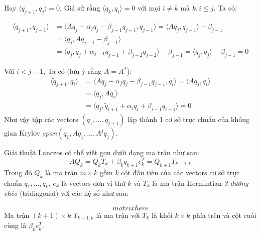 Hay $\langle q_{j+1}, q_j \rangle = 0$. Giả sử rằng $\langle q_k, q_i \rangle = 0$ với mọi 
$i \neq k$ mà $k,i \leq j$. Ta có:

\begin{equation*}
    \begin{split}
        \langle \tilde{q}_{j+1}, q_{j-1} \rangle &= \langle Aq_j - \alpha_jq_j - \beta_{j-1}q_{j-1}, q_{j-1} \rangle 
        = \langle Aq_j, q_{j-1} \rangle - \beta_{j-1} \\
        &= \langle q_j, Aq_{j-1} - \beta_{j-1} \rangle \\
        &= \langle q_j, \tilde{q}_j + \alpha_{j-1}q_{j-1} + \beta_{j-2}q_{j-2} \rangle - \beta_{j-1}
        = \langle q_j, \tilde{q}_j \rangle - \beta_{j - 1} = 0
    \end{split}
\end{equation*}

Với $i < j - 1$, Ta có (lưu ý rằng $A = A^T$):
\begin{equation*}
    \begin{split}
        \langle \tilde{q}_{j+1}, q_{i} \rangle &= \langle Aq_j - \alpha_jq_j - \beta_{j-1}q_{j-1}, q_{i} \rangle 
        = \langle Aq_j, q_i \rangle \\
        &= \langle q_j, Aq_i \rangle \\
        &= \langle q_j, \tilde{q}_{i+1} + \alpha_iq_i + \beta_{i - 1}q_{i - 1} \rangle = 0
    \end{split}
\end{equation*}
Như vậy tập các vectors $(q_1, ..., q_{j+1})$ lập thành 1 cơ sở trực chuẩn của không gian Krylov 
$span(q_1, Aq_1, ..., A^jq_1)$.

Giải thuật Lanczos có thể viết gọn dưới dạng ma trận như sau:
\begin{equation}
    AQ_k = Q_kT_k + \beta_kq_{k+1}e_k^T = Q_{k+1}T_{k+1, k}
\end{equation}
Trong đó $Q_k$ là ma trận $m \times k$ gồm $k$ cột đầu tiên của các vectors cơ sở trực chuẩn 
$q_1, ..., q_k$, $e_k$ là vectors đơn vị thứ $k$ và $T_k$ là ma trận Hermintian 
\textit{3 đường chéo} (tridiagonal) với các hệ số như sau:

\begin{equation}
    matrix here
\end{equation}
Ma trận $(k+1) \times k$ $T_{k+1,k}$ là ma trận với $T_k$ là khối $k \times k$ phía trên và
cột cuối cùng là $\beta_k e_k^T$.
